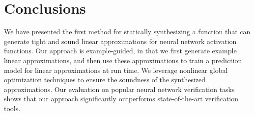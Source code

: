 

\section{Conclusions}
\label{offlinesyn:sec:conclusion}

We have presented the first method for statically
synthesizing a function that can generate tight and sound linear
approximations for neural network activation functions. Our approach
is example-guided, in that we first generate example linear
approximations, and then use these approximations to train a
prediction model for linear approximations at run time. We leverage
nonlinear global optimization techniques to ensure the soundness of
the synthesized approximations. Our evaluation on popular neural
network verification tasks shows that our approach significantly
outperforms state-of-the-art verification tools.